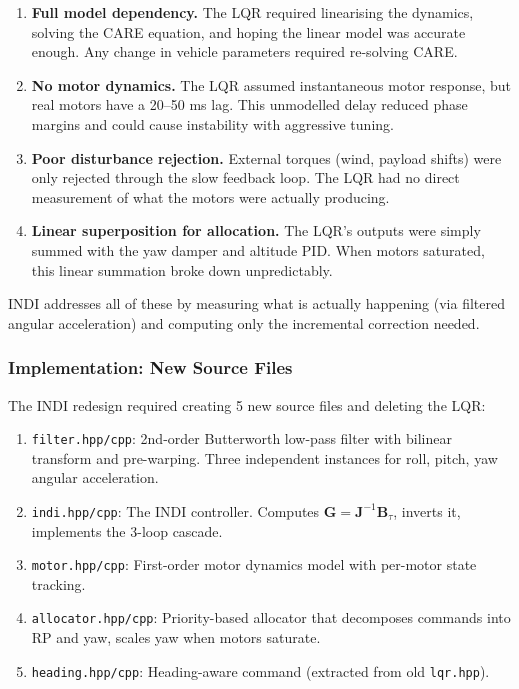 \documentclass[12pt, a4paper]{article}
\newcommand{\bJ}{\bm{J}}
\newcommand{\bB}{\bm{B}}
\begin{document}
\begin{enumerate}
    \item \textbf{Full model dependency.}  The LQR required linearising the dynamics, solving the CARE equation, and hoping the linear model was accurate enough.  Any change in vehicle parameters required re-solving CARE.

    \item \textbf{No motor dynamics.}  The LQR assumed instantaneous motor response, but real motors have a 20--50 ms lag.  This unmodelled delay reduced phase margins and could cause instability with aggressive tuning.

    \item \textbf{Poor disturbance rejection.}  External torques (wind, payload shifts) were only rejected through the slow feedback loop.  The LQR had no direct measurement of what the motors were actually producing.

    \item \textbf{Linear superposition for allocation.}  The LQR's outputs were simply summed with the yaw damper and altitude PID.  When motors saturated, this linear summation broke down unpredictably.
\end{enumerate}

INDI addresses all of these by measuring what is actually happening (via filtered angular acceleration) and computing only the incremental correction needed.

\subsubsection{Implementation: New Source Files}

The INDI redesign required creating 5 new source files and deleting the LQR:

\begin{enumerate}
    \item \texttt{filter.hpp/cpp}: 2nd-order Butterworth low-pass filter with bilinear transform and pre-warping.  Three independent instances for roll, pitch, yaw angular acceleration.

    \item \texttt{indi.hpp/cpp}: The INDI controller.  Computes $\bm{G} = \bJ^{-1}\bB_\tau$, inverts it, implements the 3-loop cascade.

    \item \texttt{motor.hpp/cpp}: First-order motor dynamics model with per-motor state tracking.

    \item \texttt{allocator.hpp/cpp}: Priority-based allocator that decomposes commands into RP and yaw, scales yaw when motors saturate.

    \item \texttt{heading.hpp/cpp}: Heading-aware command (extracted from old \texttt{lqr.hpp}).
\end{enumerate}
\end{document}
